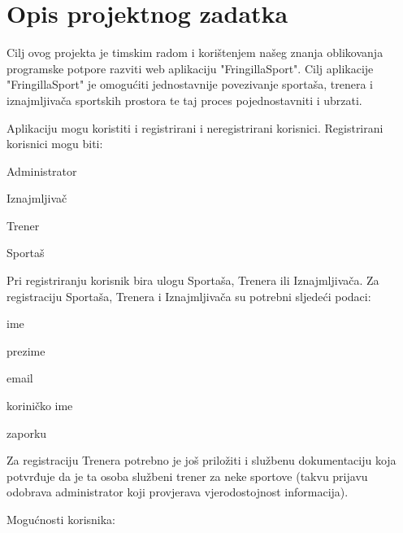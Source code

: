 \chapter{Opis projektnog zadatka}

		
		Cilj ovog projekta je timskim radom i korištenjem našeg znanja
		oblikovanja programske potpore razviti web aplikaciju "FringillaSport".
		Cilj aplikacije "FringillaSport" je omogućiti jednostavnije povezivanje sportaša, 
		trenera i iznajmljivača sportskih prostora te taj proces pojednostavniti i ubrzati.
		
		Aplikaciju mogu koristiti i registrirani i neregistrirani korisnici. 
		Registrirani korisnici mogu biti:
		
		\begin{packed_item}
			\item{Administrator}
			\item{Iznajmljivač}
			\item{Trener}
			\item{Sportaš}
		\end{packed_item}
	
		Pri registriranju korisnik bira ulogu Sportaša, Trenera ili Iznajmljivača. Za registraciju Sportaša, Trenera i Iznajmljivača
		su potrebni sljedeći podaci:
		
		\begin{packed_item}
			\item{ime}
			\item{prezime}
			\item{email}
			\item{koriničko ime}
			\item{zaporku}
		\end{packed_item}
	
	Za registraciju Trenera potrebno je još priložiti i službenu dokumentaciju koja potvrđuje da je ta osoba službeni trener za neke sportove 
	(takvu prijavu odobrava administrator koji provjerava vjerodostojnost informacija). 
	
	Mogućnosti korisnika:
	
